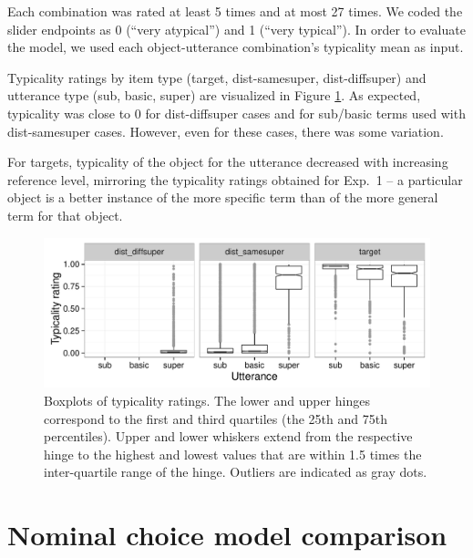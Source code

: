 \documentclass[11pt]{article}
\newcommand{\figref}[1]{Figure \ref{#1}}
\begin{document}
Each combination was rated at least 5 times and at most 27 times. We coded the slider endpoints as 0 (``very atypical'') and 1 (``very typical''). In order to evaluate the model, we used each object-utterance combination's typicality mean as input. 

Typicality ratings by item type (target, dist-samesuper, dist-diffsuper) and utterance type (sub, basic, super) are visualized in \figref{fig:typicalityboxplots}. As expected, typicality was close to 0 for dist-diffsuper cases and for sub/basic terms used with dist-samesuper cases. However, even for these cases, there was some variation. 

For targets, typicality of the object for the utterance decreased with increasing reference level, mirroring the typicality ratings obtained for Exp.~1 -- a particular object is a better instance of the more specific term than of the more general term for that object.

\begin{figure}
\centering
\includegraphics[width=\textwidth]{pics/typicalityboxplot}
\caption{Boxplots of typicality ratings. The lower and upper hinges correspond to the first and third quartiles (the 25th and 75th percentiles). Upper and lower whiskers extend from the respective hinge to the highest and lowest values that are within 1.5 times the inter-quartile range of the hinge. Outliers are indicated as gray dots.}
\label{fig:typicalityboxplots}
\end{figure}

\section{Nominal choice model comparison}
\label{app:nominalmodelcomparison}

\end{document}
